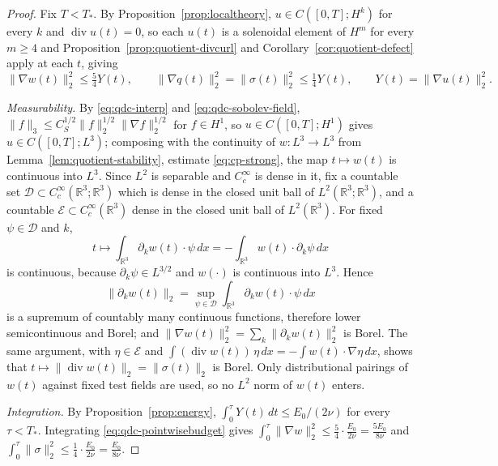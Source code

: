 \documentclass[11pt]{article}
\theoremstyle{definition}
\theoremstyle{plain}
\newcommand{\R}{\mathbb R}
\newcommand{\norm}[1]{\lVert #1\rVert}
\begin{document}
\begin{proof}
Fix $T<T_*$.  By Proposition~\ref{prop:localtheory},
$u\in C([0,T];H^k)$ for every $k$ and $\operatorname{div}u(t)=0$, so each
$u(t)$ is a solenoidal element of $H^m$ for every $m\ge4$ and
Proposition~\ref{prop:quotient-divcurl} and
Corollary~\ref{cor:quotient-defect} apply at each $t$, giving
\begin{equation}\label{eq:qdc-pointwisebudget}
 \norm{\nabla w(t)}_2^2\le\tfrac54Y(t),
 \qquad
 \norm{\nabla q(t)}_2^2=\norm{\sigma(t)}_2^2\le\tfrac14Y(t),
 \qquad Y(t)=\norm{\nabla u(t)}_2^2 .
\end{equation}

\emph{Measurability.}  By \eqref{eq:qdc-interp} and
\eqref{eq:qdc-sobolev-field},
$\norm f_3\le C_S^{1/2}\norm f_2^{1/2}\norm{\nabla f}_2^{1/2}$ for
$f\in H^1$, so $u\in C([0,T];H^1)$ gives $u\in C([0,T];L^3)$; composing with
the continuity of $w:L^3\to L^3$ from Lemma~\ref{lem:quotient-stability},
estimate \eqref{eq:cp-strong}, the map $t\mapsto w(t)$ is continuous into
$L^3$.  Since $L^2$ is separable and $C_c^\infty$ is dense in it, fix a
countable set $\mathcal D\subset C_c^\infty(\R^3;\R^3)$ which is dense in the
closed unit ball of $L^2(\R^3;\R^3)$, and a countable
$\mathcal E\subset C_c^\infty(\R^3)$ dense in the closed unit ball of
$L^2(\R^3)$.  For fixed $\psi\in\mathcal D$ and $k$,
\[
 t\longmapsto\int_{\R^3}\partial_kw(t)\cdot\psi\,dx
 =-\int_{\R^3}w(t)\cdot\partial_k\psi\,dx
\]
is continuous, because $\partial_k\psi\in L^{3/2}$ and $w(\cdot)$ is
continuous into $L^3$.  Hence
\[
 \norm{\partial_kw(t)}_2
 =\sup_{\psi\in\mathcal D}\int_{\R^3}\partial_kw(t)\cdot\psi\,dx
\]
is a supremum of countably many continuous functions, therefore lower
semicontinuous and Borel; and
$\norm{\nabla w(t)}_2^2=\sum_k\norm{\partial_kw(t)}_2^2$ is Borel.  The same
argument, with $\eta\in\mathcal E$ and
$\int(\operatorname{div}w(t))\,\eta\,dx=-\int w(t)\cdot\nabla\eta\,dx$,
shows that $t\mapsto\norm{\operatorname{div}w(t)}_2=\norm{\sigma(t)}_2$ is
Borel.
Only distributional pairings of $w(t)$ against fixed test fields are used, so
no $L^2$ norm of $w(t)$ enters.

\emph{Integration.}  By Proposition~\ref{prop:energy},
$\int_0^\tau Y(t)\,dt\le E_0/(2\nu)$ for every $\tau<T_*$.  Integrating
\eqref{eq:qdc-pointwisebudget} gives
$\int_0^\tau\norm{\nabla w}_2^2\le\frac54\cdot\frac{E_0}{2\nu}=\frac{5E_0}{8\nu}$
and
$\int_0^\tau\norm\sigma_2^2\le\frac14\cdot\frac{E_0}{2\nu}=\frac{E_0}{8\nu}$.
\end{proof}
\end{document}
